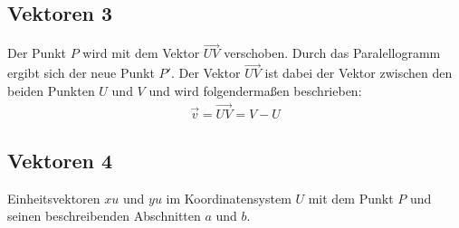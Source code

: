 \documentclass{article}
\begin{document}
    \subsection{Vektoren 3}
    \begin{figure}[h]
        \centering
    \end{figure}
    Der Punkt $P$ wird mit dem Vektor $\vec{UV}$ verschoben. Durch das Paralellogramm ergibt sich der neue Punkt $P'$. 
    Der Vektor $\vec{UV}$ ist dabei der Vektor zwischen den beiden Punkten $U$ und $V$ und wird folgendermaßen beschrieben:
    \[
        \begin{split}
            \vec{v} = \vec{UV} = V - U
        \end{split}  
    \]

    \subsection{Vektoren 4}
    \begin{figure}[h]
        \centering
    \end{figure}
    Einheitsvektoren $xu$ und $yu$ im Koordinatensystem $U$ mit dem Punkt $P$ und seinen beschreibenden Abschnitten $a$ und $b$.
    
\end{document}
